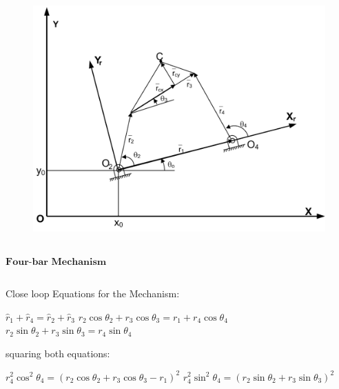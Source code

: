 \documentclass[]{beamer}
\begin{document}
{{\begin{columns}[T]
\begin{column}{.5\textwidth}
   \begin{figure}
    \centering
    \includegraphics[width = 1.0\textwidth]{mecha.png}
    \caption{}
  \end{figure}
  
    \end{column}
  \end{columns}
 }
 {
 $\textbf{Four-bar Mechanism}$\\
\vspace{0.5cm}

\begin{columns}[T]
    \begin{column}{.5\textwidth}
	Close loop Equations for the Mechanism:\\
	\vspace{0.5cm}
	
	$\widehat{r}_1+\widehat{r}_4=\widehat{r}_2+\widehat{r}_3$	
	$r_2 \cos \theta_2 +r_3 \cos \theta_3=r_1 +r_4 \cos \theta_4$
	$r_2 \sin \theta_2 +r_3 \sin \theta_3=r_4 \sin \theta_4$
	
	\vspace{0.5cm}
	squaring both equations:\\
	\vspace{0.5cm}
	
	$r_4^2 \cos^2 \theta_4=(r_2 \cos \theta_2 +r_3 \cos \theta_3-r_1)^2$
	$r_4^2 \sin^2 \theta_4=(r_2 \sin \theta_2 +r_3 \sin \theta_3)^2$\\
	
    \end{column}
    
    \begin{column}{.5\textwidth}
    

\end{column}
\end{columns}}}
\end{document}
